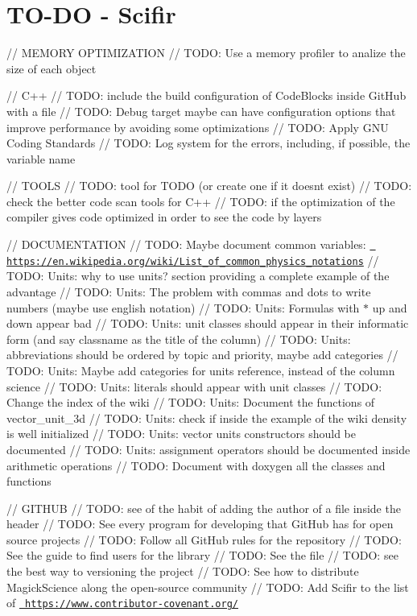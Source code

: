 \chapter{TO-\/\+DO -\/ Scifir}
\hypertarget{md_TO-DO_01-_01Scifir}{}\label{md_TO-DO_01-_01Scifir}
// MEMORY OPTIMIZATION // TODO\+: Use a memory profiler to analize the size of each object

// C++ // TODO\+: include the build configuration of Code\+Blocks inside Git\+Hub with a file // TODO\+: Debug target maybe can have configuration options that improve performance by avoiding some optimizations // TODO\+: Apply GNU Coding Standards // TODO\+: Log system for the errors, including, if possible, the variable name

// TOOLS // TODO\+: tool for TODO (or create one if it doesn\textquotesingle{}t exist) // TODO\+: check the better code scan tools for C++ // TODO\+: if the optimization of the compiler gives code optimized in order to see the code by layers

// DOCUMENTATION // TODO\+: Maybe document common variables\+: \href{https://en.wikipedia.org/wiki/List_of_common_physics_notations}{\texttt{ https\+://en.\+wikipedia.\+org/wiki/\+List\+\_\+of\+\_\+common\+\_\+physics\+\_\+notations}} // TODO\+: Units\+: why to use units? section providing a complete example of the advantage // TODO\+: Units\+: The problem with commas and dots to write numbers (maybe use english notation) // TODO\+: Units\+: Formulas with \texorpdfstring{$\ast$}{*} up and down appear bad // TODO\+: Units\+: unit classes should appear in their informatic form (and say classname as the title of the column) // TODO\+: Units\+: abbreviations should be ordered by topic and priority, maybe add categories // TODO\+: Units\+: Maybe add categories for units reference, instead of the column science // TODO\+: Units\+: literals should appear with unit classes // TODO\+: Change the index of the wiki // TODO\+: Units\+: Document the functions of vector\+\_\+unit\+\_\+3d // TODO\+: Units\+: check if inside the example of the wiki density is well initialized // TODO\+: Units\+: vector units constructors should be documented // TODO\+: Units\+: assignment operators should be documented inside arithmetic operations // TODO\+: Document with doxygen all the classes and functions

// GITHUB // TODO\+: see of the habit of adding the author of a file inside the header // TODO\+: See every program for developing that Git\+Hub has for open source projects // TODO\+: Follow all Git\+Hub rules for the repository // TODO\+: See the guide to find users for the library // TODO\+: See the  file // TODO\+: see the best way to versioning the project // TODO\+: See how to distribute Magick\+Science along the open-\/source community // TODO\+: Add Scifir to the list of \href{https://www.contributor-covenant.org/}{\texttt{ https\+://www.\+contributor-\/covenant.\+org/}}

